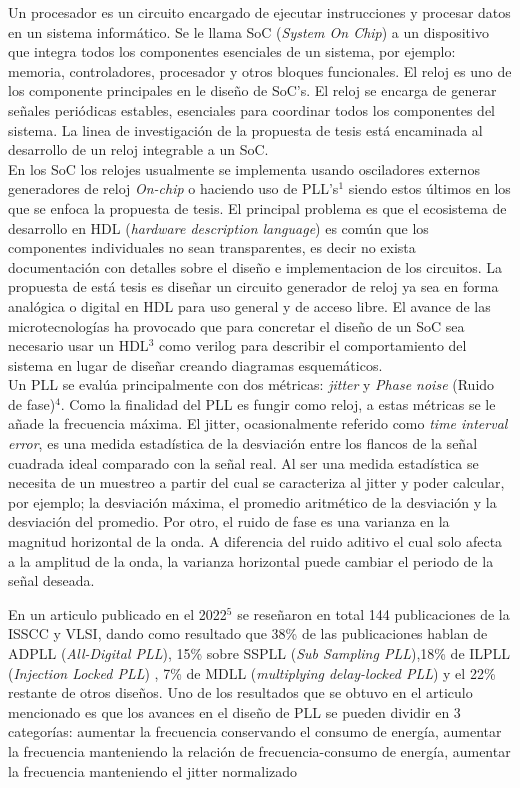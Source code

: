 \documentclass[runningheads,a4paper]{llncs}
\begin{document}
Un procesador es un circuito encargado de ejecutar instrucciones y procesar datos en un sistema informático. Se le llama SoC (\textit{System On Chip}) a un dispositivo que integra todos los componentes esenciales de un sistema, por ejemplo: memoria, controladores, procesador y otros bloques funcionales. El reloj es uno de los componente principales en le diseño de SoC's. El reloj se encarga de generar señales periódicas estables, esenciales para coordinar todos los componentes del sistema. La linea de investigación de la propuesta de tesis está encaminada al desarrollo de un reloj integrable a un SoC.\\



    En los SoC los relojes usualmente se implementa usando osciladores externos generadores de reloj \textit{On-chip} o haciendo uso de PLL's${}^1$ siendo estos últimos en los que se enfoca la propuesta de tesis. El principal problema es que el ecosistema de desarrollo en HDL (\textit{hardware description language}) es común que los componentes individuales no sean transparentes, es decir no exista documentación con detalles sobre el diseño e implementacion de los circuitos. La propuesta de está tesis es diseñar un circuito generador de reloj ya sea en forma analógica o digital en HDL para uso general y de acceso libre. El avance de las microtecnologías ha provocado que para concretar el diseño de un SoC sea necesario usar un HDL${}^3$ como verilog para describir el comportamiento del sistema en lugar de diseñar creando diagramas esquemáticos.\\

   Un PLL se evalúa principalmente con dos métricas: \textit{jitter} y \textit{Phase noise} (Ruido de fase)${}^4$. Como la finalidad del PLL es fungir como reloj, a estas métricas se le añade la frecuencia máxima. El jitter, ocasionalmente referido como \textit{time interval error}, es una medida estadística de la desviación entre los flancos de la señal cuadrada ideal comparado con la señal real. Al ser una medida estadística se necesita de un muestreo a partir del cual se caracteriza al jitter y poder calcular, por ejemplo; la desviación máxima, el promedio aritmético de la desviación y la desviación del promedio. Por otro, el ruido de fase es una varianza en la magnitud horizontal de la onda. A diferencia del ruido aditivo el cual solo afecta a la amplitud de la onda, la varianza horizontal puede cambiar el periodo de la señal deseada.

    En un articulo publicado en el 2022${}^5$ se reseñaron en total 144 publicaciones de la ISSCC y VLSI, dando como resultado que 38\% de las publicaciones hablan de ADPLL (\textit{All-Digital PLL}), 15\% sobre SSPLL (\textit{Sub Sampling PLL}),18\% de ILPLL (\textit{Injection Locked PLL}) , 7\% de MDLL (\textit{multiplying delay-locked PLL}) y el 22\% restante de otros diseños. Uno de los resultados que se obtuvo en el articulo mencionado es que los avances en el diseño de PLL se pueden dividir en 3 categorías: aumentar la frecuencia conservando el consumo de energía, aumentar la frecuencia manteniendo la relación de frecuencia-consumo de energía, aumentar la frecuencia manteniendo el jitter normalizado\\
\end{document}

